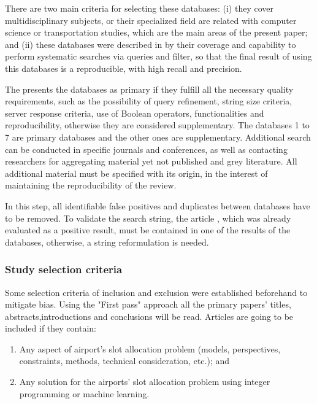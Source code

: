 There are two main criteria for selecting these databases: (i) they cover multidisciplinary subjects, or their specialized field are related with computer science or transportation studies, which are the main areas of the present paper; and (ii) these databases were described in \cite{kitchenham2007guidelines} by their coverage and capability to perform systematic searches via queries and filter, so that the final result of using this databases is a reproducible, with high recall and precision.  

The \cite{gusenbauer2020academic} presents the databases as primary if they fulfill all the necessary quality requirements, such as the possibility of query refinement, string size criteria, server response criteria, use of Boolean operators, functionalities and reproducibility, otherwise they are considered supplementary. The databases 1 to 7 are primary databases and the other ones are supplementary. Additional search can be conducted in specific journals and conferences, as well as contacting researchers for aggregating material yet not published and grey literature. All additional material must be specified with its origin, in the interest of maintaining the reproducibility of the review.

In this step, all identifiable false positives and duplicates between databases have to be removed. To validate the search string, the article \cite{ribeiro2018optimization}, which was already evaluated as a positive result, must be contained in one of the results of the databases, otherwise, a string reformulation is needed.

\subsubsection{Study selection criteria}

Some selection criteria of inclusion and exclusion were established beforehand to mitigate bias. Using the "First pass" approach \cite{keshav2007read} all the primary papers' titles, abstracts,introductions and conclusions will be read. 
Articles are going to be included if they contain: 
\begin{enumerate}
    \item Any aspect of airport's slot allocation problem (models, perspectives, constraints, methods, technical consideration, etc.); and
    \item Any solution for the airports' slot allocation problem using integer programming or machine learning.
\end{enumerate}